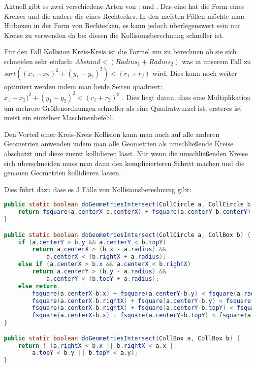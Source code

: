 
Aktuell gibt es zwei verschiedene Arten von :  und . Das eine hat die Form eines Kreises und die andere die eines Rechteckes. In den meisten Fällen möchte man Hitboxen in der Form von Rechtecken, es kann jedoch überlegenswert sein nur Kreise zu verwenden da bei diesen die Kollisionsberechnung schneller ist.

Für den Fall Kollision Kreis-Kreis ist die Formel um zu berechnen ob sie sich schneiden sehr einfach:
$ Abstand < (Radius_1 + Radius_2) $ was in unserem Fall zu $ sqrt((x_1 - x_2)^2 + (y_1 - y_2)^2) < (r_1 + r_2)$ wird. Dies kann noch weiter optimiert werden indem man beide Seiten quadriert: $ x_1 - x_2)^2 + (y_1 - y_2)^2 < (r_1 + r_2)^2 $ \cite[S 499]{DGIJ}. Dies liegt daran, dass eine Multiplikation um mehrere Größenordnungen schneller als eine Quadratwurzel ist, ersteres ist meist ein einzelner Maschinenbefehl.

Den Vorteil einer Kreis-Kreis Kollision kann man auch auf alle anderen Geometrien anwenden indem man alle Geometrien als umschließende Kreise abschätzt und diese zuerst kollidieren lässt. Nur wenn die umschließenden Kreise sich überschneiden muss man dann den komplizierteren Schritt machen und die genauen Geometrien kollidieren lassen.

Dies führt dazu dass es 3 Fälle von Kollisionsberechnung gibt:

\doinline
\begin{lstlisting}[caption=Erkennen von Kollisionen, title=\hspace{0 pt}, language=java]
public static boolean doGeometriesIntersect(CollCircle a, CollCircle b) {
	return fsquare(a.centerX-b.centerX) + fsquare(a.centerY-b.centerY) < fsquare(a.radius + b.radius);
}

public static boolean doGeometriesIntersect(CollCircle a, CollBox b) {
	if (a.centerY > b.y && a.centerY < b.topY)
		return a.centerX > (b.x - a.radius) && 
			a.centerX < (b.rightX + a.radius);
	else if (a.centerX > b.x && a.centerX < b.rightX)
		return a.centerY > (b.y - a.radius) && 
			a.centerY < (b.topY + a.radius);
	else return 
		fsquare(a.centerX-b.x) + fsquare(a.centerY-b.y) < fsquare(a.radius) ||
		fsquare(a.centerX-b.rightX) + fsquare(a.centerY-b.y) < fsquare(a.radius) ||
		fsquare(a.centerX-b.rightX) + fsquare(a.centerY-b.topY) < fsquare(a.radius) ||
		fsquare(a.centerX-b.x) + fsquare(a.centerY-b.topY) < fsquare(a.radius);
}

public static boolean doGeometriesIntersect(CollBox a, CollBox b) {
	return ! (a.rightX < b.x || b.rightX < a.x || 
		a.topY < b.y || b.topY < a.y);
}
\end{lstlisting}

